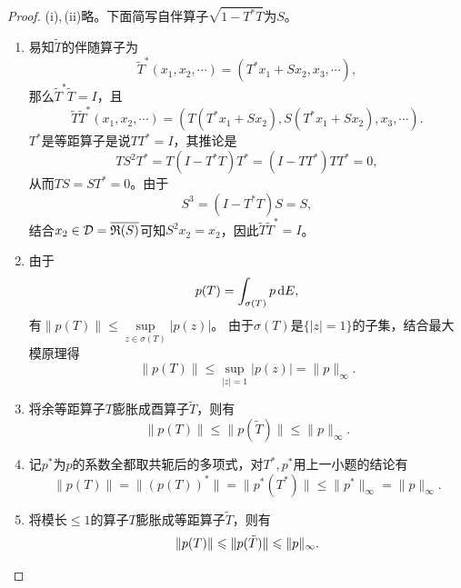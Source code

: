 \begin{proof}
    (i),\,(ii)略。下面简写自伴算子$\sqrt{1-T^*T}$为$S$。
    \begin{enumerate}[label=(\roman*)]
    \item 易知$\tilde{T}$的伴随算子为
    \[\tilde{T}^*(x_1,x_2,\cdots)=(T^*x_1+Sx_2,x_3,\cdots),\]
    那么$\tilde{T}^*\tilde{T}=I$，且
    \[\tilde{T}\tilde{T}^*(x_1,x_2,\cdots)=(T(T^*x_1+Sx_2),S(T^*x_1+Sx_2),x_3,\cdots).\]
    $T^*$是等距算子是说$TT^*=I$，其推论是
    \[TS^2T^*=T(I-T^*T)T^*=(I-TT^*)TT^*=0,\]
    从而$TS=ST^*=0$。由于
    \[S^3=(I-T^*T)S=S,\]
    结合$x_2\in\mathcal{D}=\overline{\mathfrak{R}(S)}$可知$S^2x_2=x_2$，因此$\tilde{T}\tilde{T}^*=I$。
    \item 由于\[p(T)=\int_{\sigma(T)}p\,{\rm d}E,\]
    有$\|p(T)\|\leqslant\sup\limits_{z\in\sigma(T)}|p(z)|$。
    由于$\sigma(T)$是$\{|z|=1\}$的子集，结合最大模原理得
    \[\|p(T)\|\leqslant\sup_{|z|=1}|p(z)|=\|p\|_\infty.\]
    \item 将余等距算子$T$膨胀成酉算子$\tilde{T}$，则有
    \[\|p(T)\|\leqslant\|p(\tilde{T})\|\leqslant\|p\|_\infty.\]
    \item 记$p^*$为$p$的系数全都取共轭后的多项式，对$T^*,p^*$用上一小题的结论有
    \[\|p(T)\|=\|(p(T))^*\|=\|p^*(T^*)\|\leqslant\|p^*\|_\infty=\|p\|_\infty.\]
    \item 将模长$\leqslant1$的算子$T$膨胀成等距算子$\tilde{T}$，则有
    \[\|p(T)\|\leqslant\|p(\tilde{T})\|\leqslant\|p\|_\infty.\qedhere\]
    \end{enumerate}
\end{proof}

